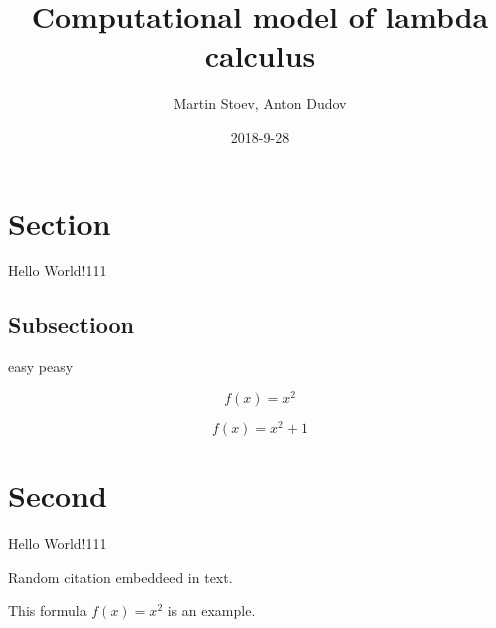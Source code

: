 \documentclass{article}
\title{Computational model of lambda calculus}
\date{2018-9-28}
\author{Martin Stoev, Anton Dudov}
\begin{document}
	\maketitle

	\newpage
	\doublespacing
	\tableofcontents
	\singlespacing

	\newpage

	\section{Section}
		Hello World!111
	\subsection{Subsectioon}
		easy peasy

	\begin{equation}
		f(x) = x^2
	\end{equation}

	\begin{equation}
		f(x) = x^2+1
	\end{equation}


	\section{Second}
		Hello World!111

	Random citation \cite{DUMMY} embeddeed in text.

	This formula $f(x) = x^2$ is an example.
	\newpage

	
	
\end{document}

